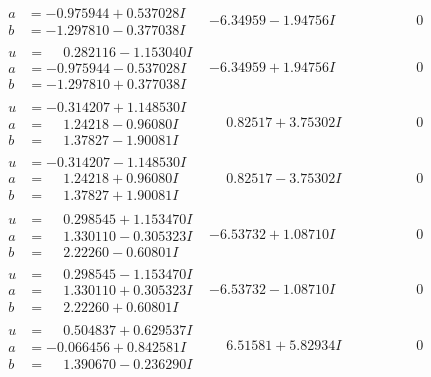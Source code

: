 \documentclass[1p]{elsarticle_modified}
\theoremstyle{definition}
\begin{document}
$$\begin{array}{c|c|c}
\begin{aligned}
a &= -0.975944 + 0.537028 I \\
b &= -1.297810 - 0.377038 I\end{aligned}
 & -6.34959 - 1.94756 I & \phantom{-0.000000 } 0 \\ \hline\begin{aligned}
u &= \phantom{-}0.282116 - 1.153040 I \\
a &= -0.975944 - 0.537028 I \\
b &= -1.297810 + 0.377038 I\end{aligned}
 & -6.34959 + 1.94756 I & \phantom{-0.000000 } 0 \\ \hline\begin{aligned}
u &= -0.314207 + 1.148530 I \\
a &= \phantom{-}1.24218 - 0.96080 I \\
b &= \phantom{-}1.37827 - 1.90081 I\end{aligned}
 & \phantom{-}0.82517 + 3.75302 I & \phantom{-0.000000 } 0 \\ \hline\begin{aligned}
u &= -0.314207 - 1.148530 I \\
a &= \phantom{-}1.24218 + 0.96080 I \\
b &= \phantom{-}1.37827 + 1.90081 I\end{aligned}
 & \phantom{-}0.82517 - 3.75302 I & \phantom{-0.000000 } 0 \\ \hline\begin{aligned}
u &= \phantom{-}0.298545 + 1.153470 I \\
a &= \phantom{-}1.330110 - 0.305323 I \\
b &= \phantom{-}2.22260 - 0.60801 I\end{aligned}
 & -6.53732 + 1.08710 I & \phantom{-0.000000 } 0 \\ \hline\begin{aligned}
u &= \phantom{-}0.298545 - 1.153470 I \\
a &= \phantom{-}1.330110 + 0.305323 I \\
b &= \phantom{-}2.22260 + 0.60801 I\end{aligned}
 & -6.53732 - 1.08710 I & \phantom{-0.000000 } 0 \\ \hline\begin{aligned}
u &= \phantom{-}0.504837 + 0.629537 I \\
a &= -0.066456 + 0.842581 I \\
b &= \phantom{-}1.390670 - 0.236290 I\end{aligned}
 & \phantom{-}6.51581 + 5.82934 I & \phantom{-0.000000 } 0 \\ \hline\begin{aligned}

\end{aligned}
\end{array}$$
\end{document}
